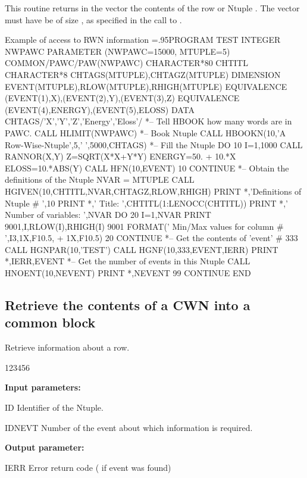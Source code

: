 This routine returns in the vector  the contents of the
row  or Ntuple .
The vector  must have be of size ,
as specified in the call to .

\begin{XMPt}{Example of access to RWN information}
\baselineskip=.95\baselineskip\relax      PROGRAM TEST
      INTEGER    NWPAWC
      PARAMETER (NWPAWC=15000, MTUPLE=5)
      COMMON/PAWC/PAW(NWPAWC)
      CHARACTER*80 CHTITL
      CHARACTER*8 CHTAGS(MTUPLE),CHTAGZ(MTUPLE)
      DIMENSION EVENT(MTUPLE),RLOW(MTUPLE),RHIGH(MTUPLE)
      EQUIVALENCE (EVENT(1),X),(EVENT(2),Y),(EVENT(3),Z)
      EQUIVALENCE (EVENT(4),ENERGY),(EVENT(5),ELOSS)
      DATA CHTAGS/'X','Y','Z','Energy','Eloss'/
*-- Tell HBOOK how many words are in PAWC.
      CALL HLIMIT(NWPAWC)
*-- Book Ntuple
      CALL HBOOKN(10,'A Row-Wise-Ntuple',5,' ',5000,CHTAGS)
*-- Fill the Ntuple
      DO 10 I=1,1000
         CALL RANNOR(X,Y)
         Z=SQRT(X*X+Y*Y)
         ENERGY=50. + 10.*X
         ELOSS=10.*ABS(Y)
         CALL HFN(10,EVENT)
 10   CONTINUE
*--   Obtain the definitions of the Ntuple
      NVAR = MTUPLE
      CALL HGIVEN(10,CHTITL,NVAR,CHTAGZ,RLOW,RHIGH)
      PRINT *,'Definitions of Ntuple # ',10
      PRINT *,'   Title: ',CHTITL(1:LENOCC(CHTITL))
      PRINT *,'   Number of variables: ',NVAR
      DO 20 I=1,NVAR
         PRINT 9001,I,RLOW(I),RHIGH(I)
9001  FORMAT(' Min/Max values for column # ',I3,1X,F10.5,
     +       1X,F10.5)
 20   CONTINUE
*--   Get the contents of 'event' # 333
      CALL HGNPAR(10,'TEST')
      CALL HGNF(10,333,EVENT,IERR)
      PRINT *,IERR,EVENT
*--   Get the number of events in this Ntuple
      CALL HNOENT(10,NEVENT)
      PRINT *,NEVENT
 99   CONTINUE
      END
\end{XMPt}


\subsection{Retrieve the contents of a CWN into a common block}


\Action

Retrieve information about a \CWN{} row.

\begin{DLttc}{123456}
\item[{\rm\bf Input parameters:}]
\item[ID] Identifier of the Ntuple.
\item[IDNEVT] Number of the event about which information is required.
\item[{\rm\bf Output parameter:}]
\item[IERR] Error return code ( if event was found)
\end{DLttc}


